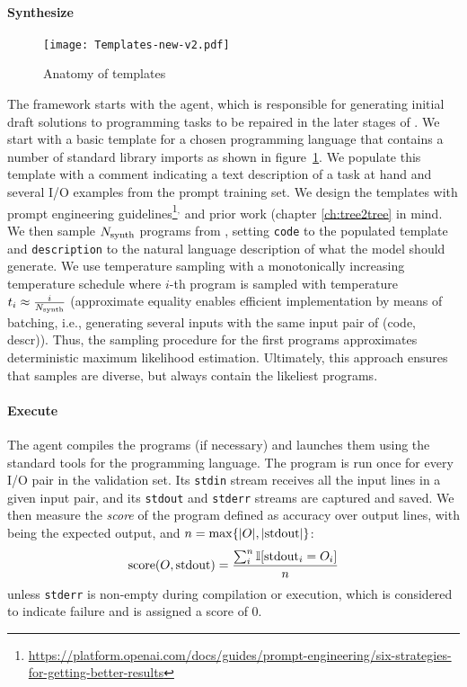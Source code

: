 \paragraph{Synthesize}
\label{sec:synth}

\begin{figure}
    \centering
    \texttt{[image: Templates-new-v2.pdf]}
    \caption{Anatomy of \synthesize{} templates}
    \label{fig:template}
\end{figure}

The framework starts with the \synthesize{} agent, which is responsible for generating initial draft solutions to programming tasks to be repaired in the later stages of \method{}.
We start with a basic template for a chosen programming language that contains a number of standard library imports as shown in figure~\ref{fig:template}.
We populate this template with a comment indicating a text description of a task at hand and several I/O examples from the prompt training set.
We design the templates with prompt engineering guidelines\footnote{\url{https://platform.openai.com/docs/guides/prompt-engineering/six-strategies-for-getting-better-results}}$^{,}$ and prior work (chapter \ref{ch:tree2tree} in mind.
We then sample $N_\text{synth}{}$ programs from \synthmodel{}, setting \texttt{code} to the populated template and \texttt{description} to the natural language description of what the model should generate.
We use temperature sampling with a monotonically increasing temperature schedule where $i$-th program is sampled with temperature $t_i \approx \frac{i}{N_\text{synth}{}}$ (approximate equality enables efficient implementation by means of batching, i.e., generating several inputs with the same input pair of (code, descr)).
Thus, the sampling procedure for the first programs approximates deterministic maximum likelihood estimation.
Ultimately, this approach ensures that samples are diverse, but always contain the likeliest programs.

\paragraph{Execute}
\label{sec:execute}

The \execute{} agent compiles the programs (if necessary) and launches them using the standard tools for the programming language.
The program is run once for every I/O pair in the validation set. 
Its \texttt{stdin} stream receives all the input lines in a given input pair, and its \texttt{stdout} and \texttt{stderr} streams are captured and saved.
We then measure the \emph{score} of the program defined as accuracy over output lines, with \expectedoutput{} being the expected output, and $n=\max\{|O{}|, |\text{stdout}|\}$:
\[    
\text{score}(O{}, \text{stdout}) = \frac{\sum^{n}_i{\mathbb{I}[\text{stdout}_i = O_i]}}{n} 
\]
unless \texttt{stderr} is non-empty during compilation or execution, which is considered to indicate failure and is assigned a score of 0.

